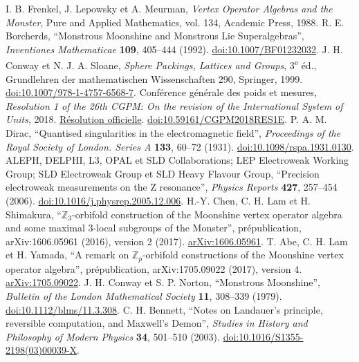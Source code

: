  I. B. Frenkel, J. Lepowsky et A. Meurman, \emph{Vertex Operator Algebras and the Monster}, Pure and Applied Mathematics, vol. 134, Academic Press, 1988.
 R. E. Borcherds, ``Monstrous Moonshine and Monstrous Lie Superalgebras'', \emph{Inventiones Mathematicae} \textbf{109}, 405--444 (1992). \href{https://doi.org/10.1007/BF01232032}{doi:10.1007/BF01232032}.
 J. H. Conway et N. J. A. Sloane, \emph{Sphere Packings, Lattices and Groups}, 3\textsuperscript{e} éd., Grundlehren der mathematischen Wissenschaften 290, Springer, 1999. \href{https://doi.org/10.1007/978-1-4757-6568-7}{doi:10.1007/978-1-4757-6568-7}.
 Conférence générale des poids et mesures, \emph{Resolution 1 of the 26th CGPM: On the revision of the International System of Units}, 2018. \href{https://www.bipm.org/en/committees/cg/cgpm/26-2018/resolution-1}{Résolution officielle}. \href{https://doi.org/10.59161/CGPM2018RES1E}{doi:10.59161/CGPM2018RES1E}.
 P. A. M. Dirac, ``Quantised singularities in the electromagnetic field'', \emph{Proceedings of the Royal Society of London. Series A} \textbf{133}, 60--72 (1931). \href{https://doi.org/10.1098/rspa.1931.0130}{doi:10.1098/rspa.1931.0130}.
 ALEPH, DELPHI, L3, OPAL et SLD Collaborations; LEP Electroweak Working Group; SLD Electroweak Group et SLD Heavy Flavour Group, ``Precision electroweak measurements on the Z resonance'', \emph{Physics Reports} \textbf{427}, 257--454 (2006). \href{https://doi.org/10.1016/j.physrep.2005.12.006}{doi:10.1016/j.physrep.2005.12.006}.
 H.-Y. Chen, C. H. Lam et H. Shimakura, ``\(\mathbb Z_3\)-orbifold construction of the Moonshine vertex operator algebra and some maximal \(3\)-local subgroups of the Monster'', prépublication, arXiv:1606.05961 (2016), version 2 (2017). \href{https://arxiv.org/abs/1606.05961}{arXiv:1606.05961}.
 T. Abe, C. H. Lam et H. Yamada, ``A remark on \(\mathbb Z_p\)-orbifold constructions of the Moonshine vertex operator algebra'', prépublication, arXiv:1705.09022 (2017), version 4. \href{https://arxiv.org/abs/1705.09022v4}{arXiv:1705.09022}.
 J. H. Conway et S. P. Norton, ``Monstrous Moonshine'', \emph{Bulletin of the London Mathematical Society} \textbf{11}, 308--339 (1979). \href{https://doi.org/10.1112/blms/11.3.308}{doi:10.1112/blms/11.3.308}.
 C. H. Bennett, ``Notes on Landauer's principle, reversible computation, and Maxwell's Demon'', \emph{Studies in History and Philosophy of Modern Physics} \textbf{34}, 501--510 (2003). \href{https://doi.org/10.1016/S1355-2198(03)00039-X}{doi:10.1016/S1355-2198(03)00039-X}.
